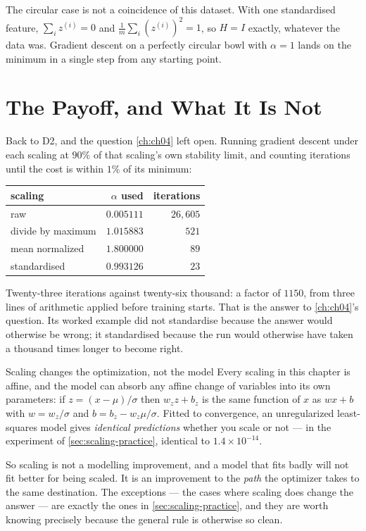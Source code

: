 The circular case is not a coincidence of this dataset. With one standardised
feature, $\sum_i z^{(i)} = 0$ and $\frac1m\sum_i (z^{(i)})^2 = 1$, so
$H = I$ exactly, whatever the data was. Gradient descent on a perfectly circular
bowl with $\alpha = 1$ lands on the minimum in a single step from any starting
point.

\section{The Payoff, and What It Is Not}
\label{sec:scaling-payoff}

Back to D2, and the question \cref{ch:ch04} left open. Running gradient descent
under each scaling at $90\%$ of that scaling's own stability limit, and counting
iterations until the cost is within $1\%$ of its minimum:

\begin{center}
\small
\renewcommand{\arraystretch}{1.2}
\begin{tabular}{@{}lrr@{}}
\toprule
scaling & $\alpha$ used & iterations\\
\midrule
raw               & $0.005111$ & $26{,}605$\\
divide by maximum & $1.015883$ & $521$\\
mean normalized   & $1.800000$ & $89$\\
standardised      & $0.993126$ & $23$\\
\bottomrule
\end{tabular}
\end{center}

Twenty-three iterations against twenty-six thousand: a factor of $1150$, from
three lines of arithmetic applied before training starts. That is the answer to
\cref{ch:ch04}'s question. Its worked example did not standardise because the
answer would otherwise be wrong; it standardised because the run would otherwise
have taken a thousand times longer to become right.

\begin{keyinsight}{Scaling changes the optimization, not the model}
Every scaling in this chapter is affine, and the model can absorb any affine
change of variables into its own parameters: if $z = (x-\mu)/\sigma$ then
$w_z z + b_z$ is the same function of $x$ as $w x + b$ with
$w = w_z/\sigma$ and $b = b_z - w_z\mu/\sigma$. Fitted to convergence, an
unregularized least-squares model gives \emph{identical predictions} whether you
scale or not --- in the experiment of \cref{sec:scaling-practice}, identical to
$1.4\times 10^{-14}$.

So scaling is not a modelling improvement, and a model that fits badly will not
fit better for being scaled. It is an improvement to the \emph{path} the
optimizer takes to the same destination. The exceptions --- the cases where
scaling does change the answer --- are exactly the ones in
\cref{sec:scaling-practice}, and they are worth knowing precisely because the
general rule is otherwise so clean.
\end{keyinsight}

